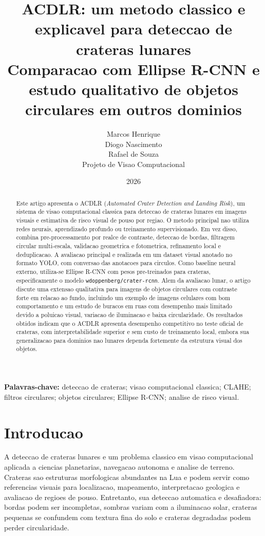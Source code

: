 \documentclass[12pt,a4paper]{article}
\title{
    \textbf{ACDLR: um metodo classico e explicavel para deteccao de crateras lunares}\\
    \large Comparacao com Ellipse R-CNN e estudo qualitativo de objetos circulares em outros dominios
}
\author{
    \begin{tabular}{c}
        Marcos Henrique\\
        Diogo Nascimento\\
        Rafael de Souza\\[0.4em]
        \small Projeto de Visao Computacional
    \end{tabular}
}
\date{2026}
\begin{document}
\maketitle

\begin{abstract}
Este artigo apresenta o ACDLR (\textit{Automated Crater Detection and Landing Risk}), um sistema de visao computacional classica para deteccao de crateras lunares em imagens visuais e estimativa de risco visual de pouso por regiao. O metodo principal nao utiliza redes neurais, aprendizado profundo ou treinamento supervisionado. Em vez disso, combina pre-processamento por realce de contraste, deteccao de bordas, filtragem circular multi-escala, validacao geometrica e fotometrica, refinamento local e deduplicacao. A avaliacao principal e realizada em um dataset visual anotado no formato YOLO, com conversao das anotacoes para circulos. Como baseline neural externo, utiliza-se Ellipse R-CNN com pesos pre-treinados para crateras, especificamente o modelo \texttt{wdoppenberg/crater-rcnn}. Alem da avaliacao lunar, o artigo discute uma extensao qualitativa para imagens de objetos circulares com contraste forte em relacao ao fundo, incluindo um exemplo de imagens celulares com bom comportamento e um estudo de buracos em ruas com desempenho mais limitado devido a poluicao visual, variacao de iluminacao e baixa circularidade. Os resultados obtidos indicam que o ACDLR apresenta desempenho competitivo no teste oficial de crateras, com interpretabilidade superior e sem custo de treinamento local, embora sua generalizacao para dominios nao lunares dependa fortemente da estrutura visual dos objetos.
\end{abstract}

\textbf{Palavras-chave:} deteccao de crateras; visao computacional classica; CLAHE; filtros circulares; objetos circulares; Ellipse R-CNN; analise de risco visual.

\section{Introducao}

A deteccao de crateras lunares e um problema classico em visao computacional aplicada a ciencias planetarias, navegacao autonoma e analise de terreno. Crateras sao estruturas morfologicas abundantes na Lua e podem servir como referencias visuais para localizacao, mapeamento, interpretacao geologica e avaliacao de regioes de pouso. Entretanto, sua deteccao automatica e desafiadora: bordas podem ser incompletas, sombras variam com a iluminacao solar, crateras pequenas se confundem com textura fina do solo e crateras degradadas podem perder circularidade.
\end{document}
